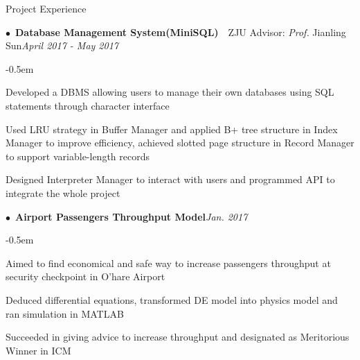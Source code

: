 \documentclass{resume} %
\begin{document}
\begin{rSection}{Project Experience}

\begin{spacing}{0.4}
$\bullet$~{\bf Database Management System(MiniSQL)}~~{ZJU Advisor: {\em Prof.} Jianling Sun}\hfill{\em April 2017 - May 2017}\smallskip\\
\end{spacing}
\begin{list}{--}{\leftmargin=1em}
	\itemsep -0.5em \vspace{-0.5em}
\item Developed a DBMS allowing users to manage their own databases using SQL statements through character interface
\item Used LRU strategy in Buffer Manager and applied B+ tree structure in Index Manager to improve efficiency, achieved slotted page structure in Record Manager to support variable-length records
\item Designed Interpreter Manager to interact with users and programmed API to integrate the whole project

\end{list}


\begin{spacing}{0.4}
$\bullet$~{\bf Airport Passengers Throughput Model}\hfill{\em Jan. 2017}\smallskip\\
\end{spacing}
\begin{list}{--}{\leftmargin=1em}
	\itemsep -0.5em \vspace{-0.5em}
\item Aimed to find economical and safe way to increase passengers throughput at security checkpoint in O’hare Airport
\item Deduced differential equations, transformed DE model into physics model and ran simulation in MATLAB
\item Succeeded in giving advice to increase throughput and designated as Meritorious Winner in ICM

\end{list}


\end{rSection}
\end{document}
